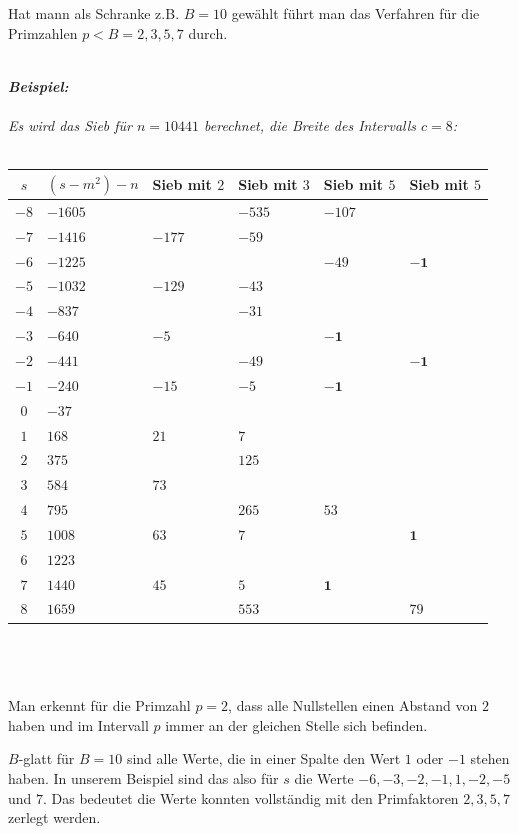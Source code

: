 \documentclass[a4paper,11pt]{article}
\begin{document}
Hat mann als Schranke z.B. $B=10$ gewählt führt man das Verfahren
für die Primzahlen $p<B = 2, 3, 5, 7$ durch.\\\\
{\it
\textbf{Beispiel:}\\\\
Es wird das Sieb für $n=10441$ berechnet, die Breite des Intervalls $c=8$:\\\\
\begin{tabular}{|c|l|l|l|l|l|}
\hline
$s$ & $(s-m^2)-n$ & Sieb mit $2$ &  Sieb mit $3$ &  Sieb mit $5$ & Sieb mit $5$\\
\hline
$-8$ & $-1605$& & $-535$& $-107$& \\
\hline
$-7$ & $-1416$& $-177$& $-59$ & & \\
\hline
$-6$ & $-1225$& & &$ -49$& $\mathbf{-1}$\\
\hline
$-5$ & $-1032$& $-129$& $-43$& & \\
\hline
$-4$ &$-837$ & &$-31$ & & \\
\hline
$-3$ & $-640$&$-5$ & &$\mathbf{-1}$ & \\
\hline
$-2$ &$ -441$& &$ -49$& &$\mathbf{-1}$ \\
\hline
$-1$ &$ -240$& $-15$& $-5$ &$ \mathbf{-1}$ & \\
\hline
$0$ & $-37$& & & & \\
\hline
$1$ &$ 168$& $21$& $7$& & \\
\hline
$2$ & $375$& &$125$ & & \\
\hline
$3$ & $584$&$73$ & & & \\
\hline
$4$ & $795$& & $265$& $53$& \\
\hline
$5$ & $1008$& $63$& $7$& &$\mathbf{1}$ \\
\hline
$6$ & $1223$& & & & \\
\hline
$7$ & $1440$ & $45$ & $5$ & $\mathbf{1}$ & \\
\hline
$8$ & $1659$ & & $553$ & & $79$ \\
\hline
\end{tabular}\\\\\\
Man erkennt für die Primzahl $p=2$, dass alle Nullstellen einen Abstand
von $2$ haben und im Intervall $p$ immer an der gleichen Stelle sich
befinden.
}

$B$-glatt für $B=10$ sind alle Werte, die in einer Spalte den Wert
$1$ oder $-1$ stehen haben. In unserem Beispiel sind das also für
$s$ die Werte $-6,-3,-2,-1,1,-2,-5$ und $7$. Das bedeutet die Werte
konnten vollständig mit den Primfaktoren $2,3,5,7$ zerlegt werden.
\end{document}
